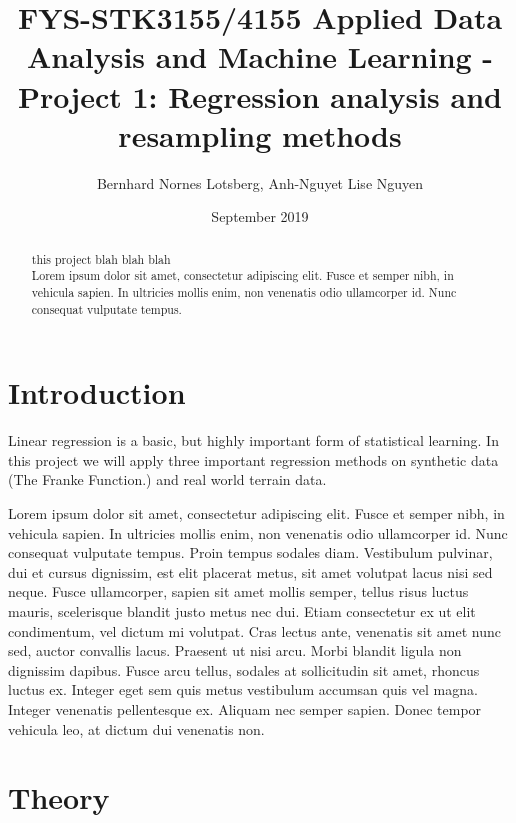\documentclass[a4paper, 10pt]{article}
\title{FYS-STK3155/4155 Applied Data Analysis and Machine Learning - Project 1: Regression analysis and resampling methods }
\author{Bernhard Nornes Lotsberg, Anh-Nguyet Lise Nguyen}
\date{September 2019}
\begin{document}
\maketitle


\begin{abstract} \noindent
    this project blah blah blah\\
    Lorem ipsum dolor sit amet, consectetur adipiscing elit. Fusce et semper nibh, in vehicula sapien. In ultricies mollis enim, non venenatis odio ullamcorper id. Nunc consequat vulputate tempus.
\end{abstract}

\begin{multicols}{2}
\section{Introduction}

Linear regression is a basic, but highly important form of statistical learning. In this project we will apply three important regression methods on synthetic data (The Franke Function.) and real world terrain data. 

Lorem ipsum dolor sit amet, consectetur adipiscing elit. Fusce et semper nibh, in vehicula sapien. In ultricies mollis enim, non venenatis     odio ullamcorper id. Nunc consequat vulputate tempus. Proin tempus sodales diam. Vestibulum pulvinar, dui et cursus dignissim, est elit placerat metus, sit amet volutpat lacus nisi sed neque. Fusce ullamcorper, sapien sit amet mollis semper, tellus risus luctus mauris, scelerisque blandit justo metus nec dui. Etiam consectetur ex ut elit condimentum, vel dictum mi volutpat. Cras lectus ante, venenatis sit amet nunc sed, auctor convallis lacus. Praesent ut nisi arcu. Morbi blandit ligula non dignissim dapibus. Fusce arcu tellus, sodales at sollicitudin sit amet, rhoncus luctus ex. Integer eget sem quis metus vestibulum accumsan quis vel magna. Integer venenatis pellentesque ex. Aliquam nec semper sapien. Donec tempor vehicula leo, at dictum dui venenatis non.


\section{Theory}

\end{multicols}
\end{document}
